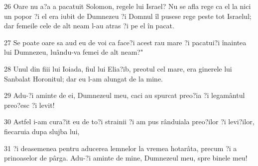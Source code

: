 \par 26 Oare nu a?a a pacatuit Solomon, regele lui Israel? Nu se afla rege ca el la nici un popor ?i el era iubit de Dumnezeu ?i Domnul îl pusese rege peste tot Israelul; dar femeile cele de alt neam l-au atras ?i pe el în pacat.
\par 27 Se poate oare sa aud eu de voi ca face?i acest rau mare ?i pacatui?i înaintea lui Dumnezeu, luându-va femei de alt neam?"
\par 28 Unul din fiii lui Ioiada, fiul lui Elia?ib, preotul cel mare, era ginerele lui Sanbalat Horonitul; dar eu l-am alungat de la mine.
\par 29 Adu-?i aminte de ei, Dumnezeul meu, caci au spurcat preo?ia ?i legamântul preo?esc ?i levit!
\par 30 Astfel i-am cura?it eu de to?i strainii ?i am pus rânduiala preo?ilor ?i levi?ilor, fiecaruia dupa slujba lui,
\par 31 ?i deasemenea pentru aducerea lemnelor la vremea hotarâta, precum ?i a prinoaselor de pârga. Adu-?i aminte de mine, Dumnezeul meu, spre binele meu!


